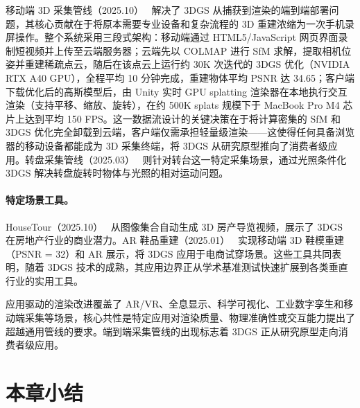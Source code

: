 移动端 3D 采集管线（2025.10）~\cite{2510_06802} 解决了 3DGS 从捕获到渲染的端到端部署问题，其核心贡献在于将原本需要专业设备和复杂流程的 3D 重建浓缩为一次手机录屏操作。整个系统采用三段式架构：移动端通过 HTML5/JavaScript 网页界面录制短视频并上传至云端服务器；云端先以 COLMAP 进行 SfM 求解，提取相机位姿并重建稀疏点云，随后在该点云上运行约 30K 次迭代的 3DGS 优化（NVIDIA RTX A40 GPU），全程平均 10 分钟完成，重建物体平均 PSNR 达 34.65；客户端下载优化后的高斯模型后，由 Unity 实时 GPU splatting 渲染器在本地执行交互渲染（支持平移、缩放、旋转），在约 500K splats 规模下于 MacBook Pro M4 芯片上达到平均 150 FPS。这一数据流设计的关键决策在于将计算密集的 SfM 和 3DGS 优化完全卸载到云端，客户端仅需承担轻量级渲染——这使得任何具备浏览器的移动设备都能成为 3D 采集终端，将 3DGS 从研究原型推向了消费者级应用。转盘采集管线（2025.03）~\cite{2503_05511} 则针对转台这一特定采集场景，通过光照条件化 3DGS 解决转盘旋转时物体与光照的相对运动问题。

\paragraph{特定场景工具。}

HouseTour（2025.10）~\cite{2510_18054} 从图像集合自动生成 3D 房产导览视频，展示了 3DGS 在房地产行业的商业潜力。AR 鞋品重建（2025.01）~\cite{2501_18643} 实现移动端 3D 鞋模重建（PSNR = 32）和 AR 展示，将 3DGS 应用于电商试穿场景。这些工具共同表明，随着 3DGS 技术的成熟，其应用边界正从学术基准测试快速扩展到各类垂直行业的实用工具。

\begin{takeaway}
应用驱动的渲染改进覆盖了 AR/VR、全息显示、科学可视化、工业数字孪生和移动端采集等场景，核心共性是特定应用对渲染质量、物理准确性或交互能力提出了超越通用管线的要求。端到端采集管线的出现标志着 3DGS 正从研究原型走向消费者级应用。
\end{takeaway}




\section*{本章小结}

